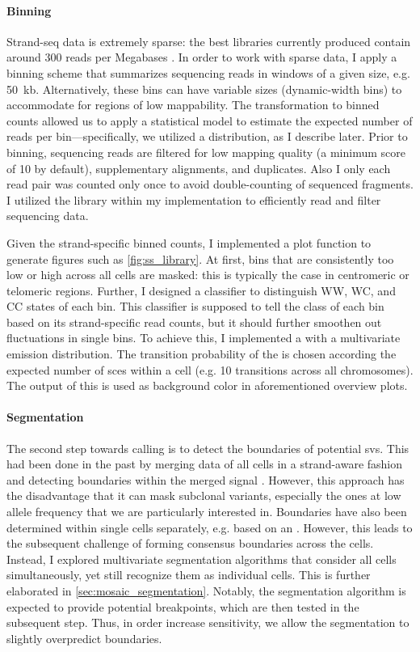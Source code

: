 \paragraph{Binning}
Strand-seq data is extremely sparse: the best libraries currently produced
contain around 300 reads per Megabases \citep{Chaisson2017,Sanders2017}. In
order to work with sparse data, I apply a binning scheme that summarizes
sequencing reads in windows of a given size, e.g. 50~kb. Alternatively, these
bins can have variable sizes (dynamic-width bins) to accommodate for regions of
low mappability. The transformation to binned counts allowed us to apply a
statistical model to estimate the expected number of reads per
bin---specifically, we utilized a \nb distribution, as I describe
later. Prior to binning, sequencing reads are filtered for low mapping quality
(a minimum score of 10 by default), supplementary alignments, and \pcr duplicates.
Also I only each read pair was counted only once to avoid double-counting of
sequenced fragments. I utilized the \htslib library within my implementation
to efficiently read and filter sequencing data.

Given the strand-specific binned counts, I implemented a plot function to
generate figures such as \cref{fig:ss_library}. At first, bins that are
consistently too low or high across all cells are masked: this is typically the
case in centromeric or telomeric regions. Further, I designed a classifier to
distinguish WW, WC, and CC states of each bin. This classifier is supposed to
tell the class of each bin based on its strand-specific read counts, but it
should further smoothen out fluctuations in single bins.
To achieve this, I implemented a \hmm with a multivariate \nb
emission distribution. The transition probability of the \hmm is chosen
according the expected number of \acp{sce} within a cell (e.g. 10 transitions
across all chromosomes). The output of this \hmm is used as background color in
aforementioned overview plots.

\paragraph{Segmentation}
The second step towards \sv calling is to detect the boundaries of potential
\acp{sv}. This had been done in the past by merging data of all cells in a
strand-aware fashion and detecting boundaries within the merged signal
\citep{Sanders2016}. However, this approach has the disadvantage that it can
mask subclonal variants, especially the ones at low allele frequency that we
are particularly interested in. Boundaries have also been determined within
single cells separately, e.g. based on an \hmm \citep{Bakker2016}. However, this
leads to the subsequent challenge of forming consensus boundaries across the
cells. Instead, I explored multivariate segmentation algorithms that consider
all cells simultaneously, yet still recognize them as individual cells. This is
further elaborated in \cref{sec:mosaic_segmentation}. Notably, the segmentation
algorithm is expected to provide potential \sv breakpoints, which are then
tested in the subsequent step. Thus, in order increase sensitivity, we allow the
segmentation to slightly overpredict boundaries.

